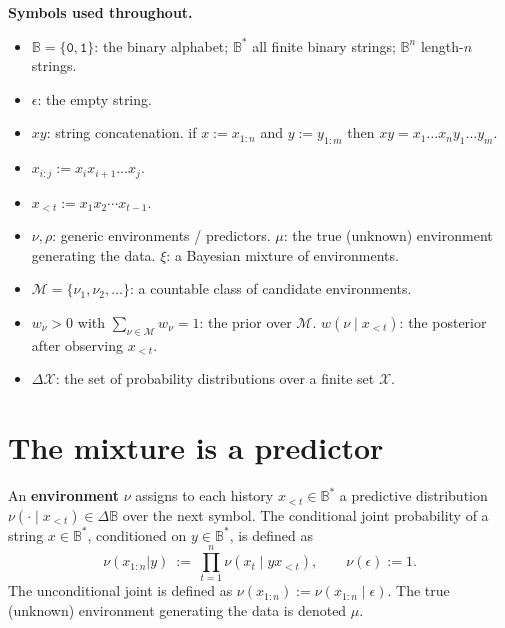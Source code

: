 \documentclass[fontsize=11pt, parskip=half]{scrartcl}
\newcommand{\Mc}{\mathcal{M}}
\begin{document}
\begin{callout}[note]
\textbf{Symbols used throughout.}
\begin{itemize}\itemsep=2pt
  \item $\mathbb{B} = \{\texttt{0}, \texttt{1}\}$: the binary alphabet; $\mathbb{B}^*$ all finite binary strings; $\mathbb{B}^n$ length-$n$ strings.
  \item $\epsilon$: the empty string. 
  \item $xy$: string concatenation. if $x := x_{1:n}$ and $y := y_{1:m}$ then
  $xy = x_1 \ldots x_n y_1 \ldots y_m$. 
  \item $x_{i:j} := x_i x_{i+1} \ldots x_j$.
  \item $x_{<t} := x_1 x_2 \cdots x_{t-1}$.
  \item $\nu, \rho$: generic environments / predictors. $\mu$: the true (unknown) environment generating the data. $\xi$: a Bayesian mixture of environments.
  \item $\Mc = \{\nu_1, \nu_2, \ldots\}$: a countable class of candidate environments.
  \item $w_\nu > 0$ with $\sum_{\nu \in \Mc} w_\nu = 1$: the prior over $\Mc$. $w(\nu \mid x_{<t})$: the posterior after observing $x_{<t}$.
  \item $\Delta \mathcal{X}$: the set of probability distributions over a finite set $\mathcal{X}$.
\end{itemize}
\end{callout}

\section{The mixture is a predictor}\label{prob:one_step}

\begin{definition}[Environment]\label{def:environment}
An \textbf{environment} $\nu$ assigns to each history $x_{<t} \in \mathbb{B}^*$ a predictive distribution $\nu(\cdot \mid x_{<t}) \in \Delta \mathbb{B}$ over the next symbol. The conditional joint probability of a string $x \in \mathbb{B}^*$, conditioned on $y \in \mathbb{B}^*$, is defined as
\[
\nu(x_{1:n} | y) ~:=~ \prod_{t=1}^{n} \nu(x_t \mid y x_{<t}), \qquad \nu(\epsilon) := 1.
\]
The unconditional joint is defined as $\nu(x_{1:n}) := \nu(x_{1:n} \mid \epsilon)$.
The true (unknown) environment generating the data is denoted $\mu$.
\end{definition}
\end{document}
